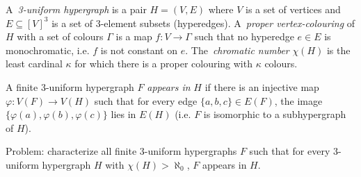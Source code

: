 A \,\emph{3-uniform hypergraph} is a pair $H=(V,E)$ where $V$ is a set of vertices and $E\subseteq [V]^3$ is a set of 3-element subsets (hyperedges).
A \,\emph{proper vertex-colouring} of $H$ with a set of colours $\Gamma$ is a map $f:V\to\Gamma$ such that no hyperedge $e\in E$ is monochromatic, i.e. $f$ is not constant on $e$.
The \,\emph{chromatic number} $\chi(H)$ is the least cardinal $\kappa$ for which there is a proper colouring with $\kappa$ colours.

A finite 3-uniform hypergraph $F$ \emph{appears in} $H$ if there is an injective map $\varphi:V(F)\to V(H)$ such that for every edge $\{a,b,c\}\in E(F)$, the image $\{\varphi(a),\varphi(b),\varphi(c)\}$ lies in $E(H)$ (i.e. $F$ is isomorphic to a subhypergraph of $H$).

Problem: characterize all finite 3-uniform hypergraphs $F$ such that for every 3-uniform hypergraph $H$ with $\chi(H)>\aleph_0$, $F$ appears in $H$.

